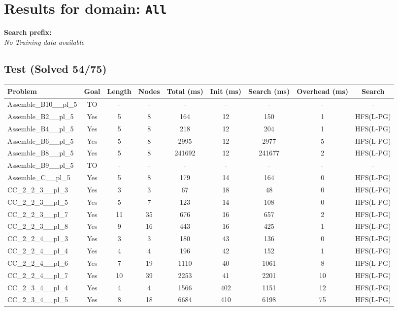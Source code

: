 \documentclass{article}
\begin{document}
\section*{Results for domain: \texttt{All}}
\textbf{Search prefix:} 
\\[0.5cm]
\textit{No Training data available}\\[0.5cm]
\subsection*{Test (Solved 54/75)}
\begin{tabular}{lcccccccc}
\toprule
Problem & Goal & Length & Nodes & Total (ms) & Init (ms) & Search (ms) & Overhead (ms) & Search \\
\midrule
Assemble\_B10\_\_pl\_5 & TO & - & - & - & - & - & - & - \\
Assemble\_B2\_\_pl\_5 & Yes & 5 & 8 & 164 & 12 & 150 & 1 & HFS(L-PG) \\
Assemble\_B4\_\_pl\_5 & Yes & 5 & 8 & 218 & 12 & 204 & 1 & HFS(L-PG) \\
Assemble\_B6\_\_pl\_5 & Yes & 5 & 8 & 2995 & 12 & 2977 & 5 & HFS(L-PG) \\
Assemble\_B8\_\_pl\_5 & Yes & 5 & 8 & 241692 & 12 & 241677 & 2 & HFS(L-PG) \\
Assemble\_B9\_\_pl\_5 & TO & - & - & - & - & - & - & - \\
Assemble\_C\_\_pl\_5 & Yes & 5 & 8 & 179 & 14 & 164 & 0 & HFS(L-PG) \\
CC\_2\_2\_3\_\_pl\_3 & Yes & 3 & 3 & 67 & 18 & 48 & 0 & HFS(L-PG) \\
CC\_2\_2\_3\_\_pl\_5 & Yes & 5 & 7 & 123 & 14 & 108 & 0 & HFS(L-PG) \\
CC\_2\_2\_3\_\_pl\_7 & Yes & 11 & 35 & 676 & 16 & 657 & 2 & HFS(L-PG) \\
CC\_2\_2\_3\_\_pl\_8 & Yes & 9 & 16 & 443 & 16 & 425 & 1 & HFS(L-PG) \\
CC\_2\_2\_4\_\_pl\_3 & Yes & 3 & 3 & 180 & 43 & 136 & 0 & HFS(L-PG) \\
CC\_2\_2\_4\_\_pl\_4 & Yes & 4 & 4 & 196 & 42 & 152 & 1 & HFS(L-PG) \\
CC\_2\_2\_4\_\_pl\_6 & Yes & 7 & 19 & 1110 & 40 & 1061 & 8 & HFS(L-PG) \\
CC\_2\_2\_4\_\_pl\_7 & Yes & 10 & 39 & 2253 & 41 & 2201 & 10 & HFS(L-PG) \\
CC\_2\_3\_4\_\_pl\_4 & Yes & 4 & 4 & 1566 & 402 & 1151 & 12 & HFS(L-PG) \\
CC\_2\_3\_4\_\_pl\_5 & Yes & 8 & 18 & 6684 & 410 & 6198 & 75 & HFS(L-PG) \\

\end{tabular}
\end{document}
